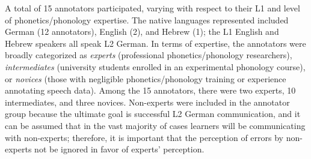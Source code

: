 \documentclass[a4paper]{article}
\begin{document}
		A total of 15 annotators participated, varying with respect to their L1 and level of phonetics/phonology expertise. 
		The native languages represented included German (12 annotators), English (2), and Hebrew (1); the L1 English and Hebrew speakers all speak L2 German. 
		In terms of expertise, the annotators were broadly categorized as \textit{experts} (professional phonetics/phonology researchers), \textit{intermediates} (university students enrolled in an experimental phonology course), or \textit{novices} (those with negligible phonetics/phonology training or experience annotating speech data). Among the 15 annotators, there were two experts, 10 intermediates, and three novices. 		
		{\color{blue}
		Non-experts were included in the annotator group because the ultimate goal is successful L2 German communication, %
		and it can be assumed that in the vast majority of cases learners will be communicating with non-experts; 
		therefore, %
		it is important that the perception of %
		errors by non-experts not be ignored in favor of experts' perception.
		}
\end{document}
